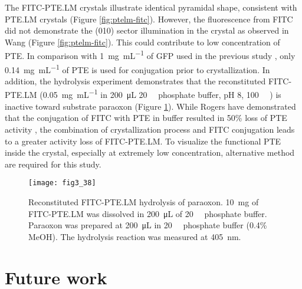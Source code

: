 \begin{refsection}
The FITC-PTE.LM crystals illustrate identical pyramidal shape, consistent with
PTE.LM crystals (Figure \ref{fig:ptelm-fitc}). However, the fluorescence from
FITC did not demonstrate the (010) sector illumination in the
crystal as observed in Wang  \cite{Wang2001a} (Figure
\ref{fig:ptelm-fitc}). This could contribute to low concentration of PTE. In
comparison with \SI{1}{\mg\per\mL} of GFP used in the previous study
\cite{Kurimoto1999}, only \SI{0.14}{\mg\per\mL} of PTE is used for conjugation
prior to crystallization. In addition, the hydrolysis experiment demonstrates
that the reconstituted FITC-PTE.LM (\SI{0.05}{\mg\per\mL} in
\SI{200}{\micro\liter} \SI{20}{\milli\Molar} phosphate buffer, pH 8,
\SI{100}{\micro\Molar} ) is inactive toward substrate paraoxon
(Figure \ref{fig:last}). While Rogers  have demonstrated that the
conjugation of FITC with PTE in buffer resulted in 50\% loss of PTE activity
\cite{Rogers1999}, the combination of crystallization process and FITC
conjugation leads to a greater activity loss of FITC-PTE.LM. To visualize the
functional PTE inside the crystal, especially at extremely low concentration,
alternative method are required for this study.
\begin{figure}[h!] \centering \texttt{[image: fig3\_38]}
    \caption[Reconstituted FITC-PTE.LM hydrolysis of paraoxon. \SI{10}{\mg} of
    FITC-PTE.LM was dissolved in \SI{200}{\micro\liter} of
\SI{20}{\milli\Molar} phosphate buffer. Paraoxon was prepared at
\SI{200}{\micro\liter} in \SI{20}{\milli\Molar} phosphate buffer (0.4\% MeOH).
The hydrolysis reaction was measured at \SI{405}{\nm}.]{Reconstituted
    FITC-PTE.LM hydrolysis of paraoxon. \SI{10}{\mg} of FITC-PTE.LM was
    dissolved in \SI{200}{\micro\liter} of \SI{20}{\milli\Molar} phosphate
    buffer. Paraoxon was prepared at \SI{200}{\micro\liter} in
    \SI{20}{\milli\Molar} phosphate buffer (0.4\% MeOH). The hydrolysis
    reaction was measured at \SI{405}{\nm}.}
    \label{fig:last}
\end{figure}

\section{Future work}


\end{refsection}
